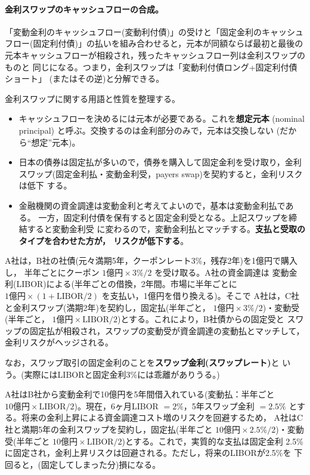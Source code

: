 \paragraph{金利スワップのキャッシュフローの合成。}
「変動金利のキャッシュフロー(変動利付債)」の受けと「固定金利のキャッシュ
フロー(固定利付債)」の払いを組み合わせると，元本が同額ならば最初と最後の
元本キャッシュフローが相殺され，残ったキャッシュフロー列は金利スワップのものと
同じになる。つまり，金利スワップは「変動利付債ロング+固定利付債ショート」
(またはその逆)と分解できる。

金利スワップに関する用語と性質を整理する。
\begin{itemize}
\item キャッシュフローを決めるには元本が必要である。これを\textbf{想定元本}
(nominal principal) と呼ぶ。交換するのは金利部分のみで，元本は交換しない
(だから“想定”元本)。
\item 日本の債券は固定払が多いので，債券を購入して固定金利を受け取り，金利
スワップ(固定金利払・変動金利受，payers swap)を契約すると，金利リスクは低下
する。
\item 金融機関の資金調達は変動金利と考えてよいので，基本は変動金利払である。
一方，固定利付債を保有すると固定金利受となる。上記スワップを締結すると変動金利受
に変わるので，変動金利払とマッチする。\textbf{支払と受取のタイプを合わせた方が，
リスクが低下する}。
\end{itemize}

\begin{example}
A社は，B社の社債(元々満期5年，クーポンレート3\%，残存2年)を1億円で購入し，
半年ごとにクーポン $1\text{億円}\times 3\%/2$ を受け取る。A社の資金調達は
変動金利(LIBOR)による(半年ごとの借換，2年間。市場に半年ごとに
$1\text{億円}\times(1+\text{LIBOR}/2)$ を支払い，1億円を借り換える)。そこで
A社は，C社と金利スワップ(満期2年)を契約し，固定払(半年ごと，
$1\text{億円}\times 3\%/2$)・変動受(半年ごと，
$1\text{億円}\times\text{LIBOR}/2$)とする。これにより，B社債からの固定受と
スワップの固定払が相殺され，スワップの変動受が資金調達の変動払とマッチして，
金利リスクがヘッジされる。

なお，スワップ取引の固定金利のことを\textbf{スワップ金利(スワップレート)}と
いう。(実際にはLIBORと固定金利3\%には乖離がありうる。)
\end{example}

\begin{example}
A社はB社から変動金利で10億円を5年間借入れている(変動払：半年ごと
$10\text{億円}\times\text{LIBOR}/2$)。現在，6ヶ月LIBOR $=2\%$，5年スワップ金利
$=2.5\%$ とする。将来の金利上昇による資金調達コスト増のリスクを回避するため，
A社はC社と満期5年の金利スワップを契約し，固定払(半年ごと
$10\text{億円}\times 2.5\%/2$)・変動受(半年ごと
$10\text{億円}\times\text{LIBOR}/2$)とする。これで，実質的な支払は固定金利
2.5\%に固定され，金利上昇リスクは回避される。ただし，将来のLIBORが2.5\%を
下回ると，(固定してしまった分)損になる。
\end{example}

